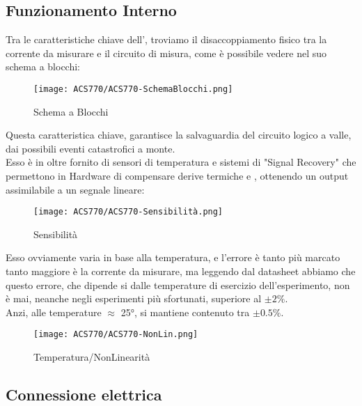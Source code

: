 \subsection{Funzionamento Interno}

Tra le caratteristiche chiave dell'\cite{ACS770}, troviamo il disaccoppiamento fisico tra la corrente da misurare e il circuito di misura, come è possibile vedere nel suo schema a blocchi: 

\begin{figure}[h]
	\centering
	\texttt{[image: ACS770/ACS770-SchemaBlocchi.png]}
	\caption[ Schema a Blocchi]{Schema a Blocchi}
\end{figure}

\noindent
Questa caratteristica chiave, garantisce la salvaguardia del circuito logico a valle, dai possibili eventi catastrofici a monte.\\
Esso è in oltre fornito di sensori di temperatura e sistemi di "Signal Recovery" che permettono in Hardware di compensare derive termiche e \nonLinearita, ottenendo un output assimilabile a un segnale lineare:

\begin{figure}[h]
	\centering
	\texttt{[image: ACS770/ACS770-Sensibilità.png]}
	\caption[ Sensibilità rispetto Temperatura]{Sensibilità}
\end{figure}

\noindent
Esso ovviamente varia in base alla temperatura, e l'errore è tanto più marcato tanto maggiore è la corrente da misurare, ma leggendo dal datasheet abbiamo che questo errore, che dipende si dalle temperature di esercizio dell'esperimento, non è mai, neanche negli esperimenti più sfortunati, superiore al $\pm2\%$.\\
Anzi, alle temperature $\approx$ 25°, si mantiene contenuto tra $\pm0.5\%$.

\begin{figure}[h]
	\centering
	\texttt{[image: ACS770/ACS770-NonLin.png]}
	\caption[ \nonLinearita]{Temperatura/NonLinearità}
\end{figure}

\newpage

\subsection{Connessione elettrica}

